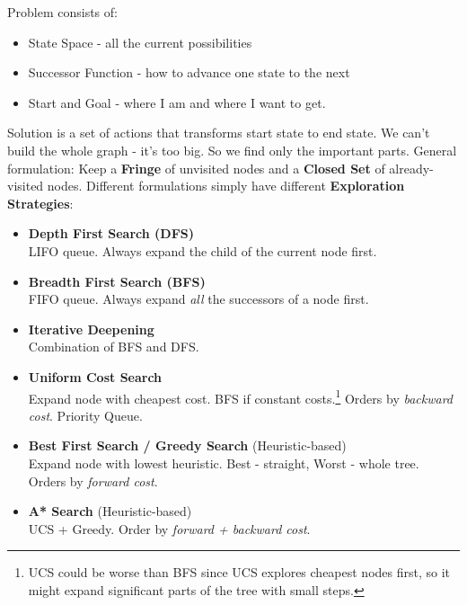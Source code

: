 \documentclass[]{article}
\begin{document}
Problem consists of:
\begin{itemize}
    \item State Space - all the current possibilities
    \item Successor Function - how to advance one state to the next
    \item Start and Goal - where I am and where I want to get.
\end{itemize}
Solution is a set of actions that transforms start state to end state. We can't build the whole graph - it's too big. So we find only the important parts. General formulation:
Keep a \textbf{Fringe} of unvisited nodes and a \textbf{Closed Set} of already-visited nodes.
Different formulations simply have different \textbf{Exploration Strategies}:
\begin{itemize}

    \item \textbf{Depth First Search (DFS)} \\
    LIFO queue. Always expand the child of the current node first. \\

    \item \textbf{Breadth First Search (BFS)} \\
     FIFO queue. Always expand \emph{all} the successors of a node first. \\

    \item \textbf{Iterative Deepening} \\
     Combination of BFS and DFS. \\
     
     \item \textbf{Uniform Cost Search} \\
     Expand node with cheapest cost. BFS if constant costs.\footnote{UCS could be worse than BFS since UCS explores cheapest nodes first, so it might expand significant parts of the tree with small steps.} Orders by \emph{backward cost}. Priority Queue. \\
     
     \item \textbf{Best First Search / Greedy Search} (Heuristic-based)\\
     Expand node with lowest heuristic. Best - straight, Worst - whole tree. Orders by \emph{forward cost}.\\
     
     \item \textbf{A* Search} (Heuristic-based)\\
     UCS + Greedy. Order by \emph{forward + backward cost}.\\
\end{itemize}
\end{document}
